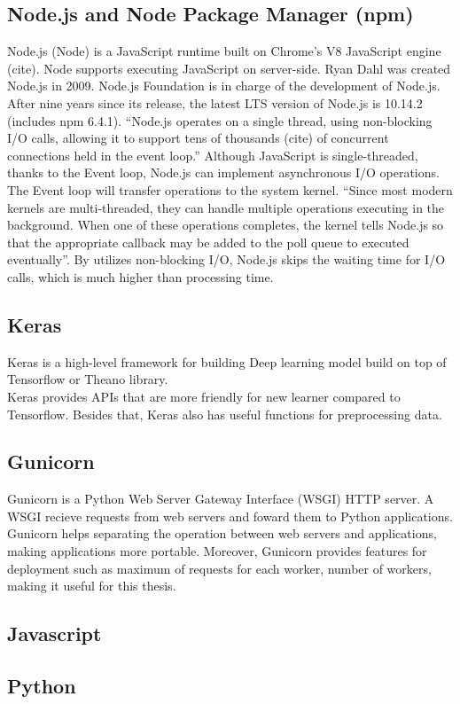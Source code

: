\subsection{Node.js and Node Package Manager (npm)}
Node.js (Node) is a JavaScript runtime built on Chrome's V8 JavaScript engine (cite). Node supports executing JavaScript on server-side. Ryan Dahl was created Node.js in 2009. Node.js Foundation is in charge of the development of Node.js. After nine years since its release, the latest LTS version of Node.js is 10.14.2 (includes npm 6.4.1). “Node.js operates on a single thread, using non-blocking I/O calls, allowing it to support tens of thousands (cite) of concurrent connections held in the event loop.” Although JavaScript is single-threaded, thanks to the Event loop, Node.js can implement asynchronous I/O operations. The Event loop will transfer operations to the system kernel. “Since most modern kernels are multi-threaded, they can handle multiple operations executing in the background. When one of these operations completes, the kernel tells Node.js so that the appropriate callback may be added to the poll queue to executed eventually”. By utilizes non-blocking I/O, Node.js skips the waiting time for I/O calls, which is much higher than processing time.
\subsection{Keras}
Keras is a high-level framework for building Deep learning model build on top of Tensorflow or Theano library.\\
Keras provides APIs that are more friendly for new learner compared to Tensorflow. Besides that, Keras also has useful functions for preprocessing data.
\subsection{Gunicorn}
Gunicorn is a Python Web Server Gateway Interface (WSGI) HTTP server. A WSGI recieve requests from web servers and foward them to Python applications.
Gunicorn helps separating the operation between web servers and applications, making applications more portable. Moreover, Gunicorn provides features for deployment such as maximum of requests for each worker, number of workers, making it useful for this thesis.
\subsection{Javascript}
\subsection{Python}
